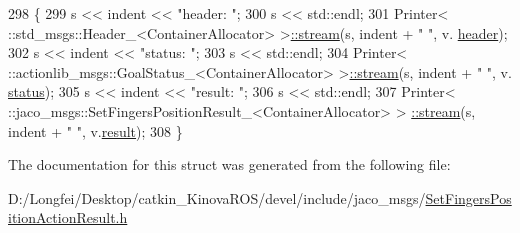 \begin{DoxyCode}
298   \{
299     s << indent << \textcolor{stringliteral}{"header: "};
300     s << std::endl;
301     Printer< ::std\_msgs::Header\_<ContainerAllocator> >\hyperlink{structros_1_1message__operations_1_1Printer_3_01_1_1jaco__msgs_1_1SetFingersPositionActionResult044e352a34a7e800d3ed4a693b89337f_a6c16a0d639132e8751510460c02e8b4e}{::stream}(s, indent + \textcolor{stringliteral}{"  "}, v.
      \hyperlink{structjaco__msgs_1_1SetFingersPositionActionResult___afe9c9e9a117299f47004490d673fca99}{header});
302     s << indent << \textcolor{stringliteral}{"status: "};
303     s << std::endl;
304     Printer< ::actionlib\_msgs::GoalStatus\_<ContainerAllocator> >\hyperlink{structros_1_1message__operations_1_1Printer_3_01_1_1jaco__msgs_1_1SetFingersPositionActionResult044e352a34a7e800d3ed4a693b89337f_a6c16a0d639132e8751510460c02e8b4e}{::stream}(s, indent + \textcolor{stringliteral}{"  "}, v.
      \hyperlink{structjaco__msgs_1_1SetFingersPositionActionResult___a2071f3ed40cf494554bf7dab9b8da10d}{status});
305     s << indent << \textcolor{stringliteral}{"result: "};
306     s << std::endl;
307     Printer< ::jaco\_msgs::SetFingersPositionResult\_<ContainerAllocator> >
      \hyperlink{structros_1_1message__operations_1_1Printer_3_01_1_1jaco__msgs_1_1SetFingersPositionActionResult044e352a34a7e800d3ed4a693b89337f_a6c16a0d639132e8751510460c02e8b4e}{::stream}(s, indent + \textcolor{stringliteral}{"  "}, v.\hyperlink{structjaco__msgs_1_1SetFingersPositionActionResult___a56e4fe7830f94aed326d00adc8cf0ac3}{result});
308   \}
\end{DoxyCode}


The documentation for this struct was generated from the following file\+:\begin{DoxyCompactItemize}
\item 
D\+:/\+Longfei/\+Desktop/catkin\+\_\+\+Kinova\+R\+O\+S/devel/include/jaco\+\_\+msgs/\hyperlink{SetFingersPositionActionResult_8h}{Set\+Fingers\+Position\+Action\+Result.\+h}\end{DoxyCompactItemize}
